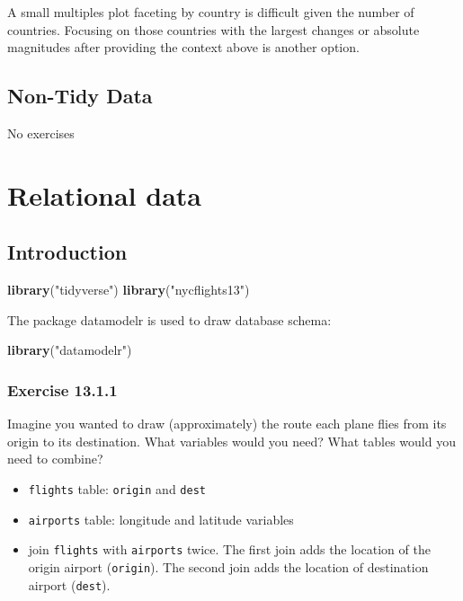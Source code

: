 \documentclass[]{book}
\newenvironment{Shaded}{\begin{snugshade}}{\end{snugshade}}
\newcommand{\KeywordTok}[1]{\textcolor[rgb]{0.13,0.29,0.53}{\textbf{#1}}}
\newcommand{\NormalTok}[1]{#1}
\newcommand{\StringTok}[1]{\textcolor[rgb]{0.31,0.60,0.02}{#1}}
\providecommand{\tightlist}{%
  \setlength{\itemsep}{0pt}\setlength{\parskip}{0pt}}
\theoremstyle{plain}
\theoremstyle{remark}
\begin{document}
A small multiples plot faceting by country is difficult given the number
of countries. Focusing on those countries with the largest changes or
absolute magnitudes after providing the context above is another option.

\hypertarget{non-tidy-data}{%
\section{Non-Tidy Data}\label{non-tidy-data}}

No exercises

\hypertarget{relational-data}{%
\chapter{Relational data}\label{relational-data}}

\hypertarget{introduction-8}{%
\section{Introduction}\label{introduction-8}}

\begin{Shaded}
\begin{Highlighting}[]
\KeywordTok{library}\NormalTok{(}\StringTok{"tidyverse"}\NormalTok{)}
\KeywordTok{library}\NormalTok{(}\StringTok{"nycflights13"}\NormalTok{)}
\end{Highlighting}
\end{Shaded}

The package datamodelr is used to draw database schema:

\begin{Shaded}
\begin{Highlighting}[]
\KeywordTok{library}\NormalTok{(}\StringTok{"datamodelr"}\NormalTok{)}
\end{Highlighting}
\end{Shaded}

\hypertarget{exercise-13.1.1}{%
\subsection*{\texorpdfstring{Exercise
{13.1.1}}{Exercise 13.1.1}}\label{exercise-13.1.1}}

Imagine you wanted to draw (approximately) the route each plane flies
from its origin to its destination. What variables would you need? What
tables would you need to combine?

\begin{itemize}
\tightlist
\item
  \texttt{flights} table: \texttt{origin} and \texttt{dest}
\item
  \texttt{airports} table: longitude and latitude variables
\item
  join \texttt{flights} with \texttt{airports} twice. The first join
  adds the location of the origin airport (\texttt{origin}). The second
  join adds the location of destination airport (\texttt{dest}).
\end{itemize}
\end{document}
